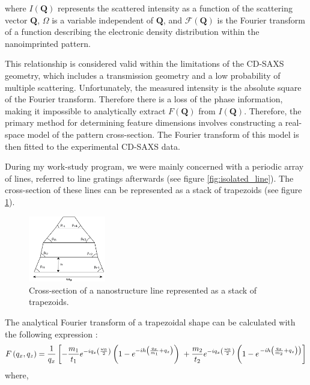 where $I(\mathbf{Q})$ represents the scattered intensity as a function of the scattering
vector $\mathbf{Q}$, $\Omega$ is a variable independent of $\mathbf{Q}$,
and $\mathcal{F}(\mathbf{Q})$ is the Fourier transform of a function describing the electronic density
distribution within the nanoimprinted pattern.

This relationship is considered valid within the limitations of the CD-SAXS geometry,
which includes a transmission geometry and a low probability of multiple scattering.
Unfortunately, the measured intensity is the absolute square of the Fourier transform. Therefore 
there is a loss of the phase information, making it impossible to analytically extract $F(\mathbf{Q})$ from $I(\mathbf{Q})$.
Therefore, the primary method for determining feature dimensions involves constructing
a real-space model of the pattern cross-section. The Fourier transform of this 
model is then fitted to the experimental CD-SAXS data.

\medskip

During my work-study program, we were mainly concerned with a periodic array of lines, referred to line gratings afterwards (see figure \ref{fig:isolated_line}). The cross-section of
these lines can be represented as a stack of trapezoids (see figure \ref{fig:trapezoid_model}).

\begin{figure}[h]
    \centering
    \includegraphics[width=0.3\textwidth]{images/trapezoid.png}
    \caption{Cross-section of a nanostructure line represented as a stack of trapezoids.}
    \label{fig:trapezoid_model}
\end{figure}

The analytical Fourier transform of a trapezoidal shape can be calculated with the following expression \cite{sunday_2015}:
\begin{equation}
    F\left(q_{x}, q_{z}\right)=\frac{1}{q_{x}}\left[-\frac{m_{1}}{t_{1}} e^{-i q_{x}\left(\frac{\omega_{0}}{2}\right)}\left(1-e^{-i h\left(\frac{q_{x}}{m_{1}}+q_{z}\right)}\right)\right. \\ +\frac{m_{2}}{t_{2}} e^{-i q_{x}\left(\frac{\omega_{0}}{2}\right)}\left(1-e^{\left.-i h\left(\frac{q_{x}}{m_{2}}+q_{z}\right)\right)}\right]
    \label{eq:trapezoidal_ft}
\end{equation}
where,


